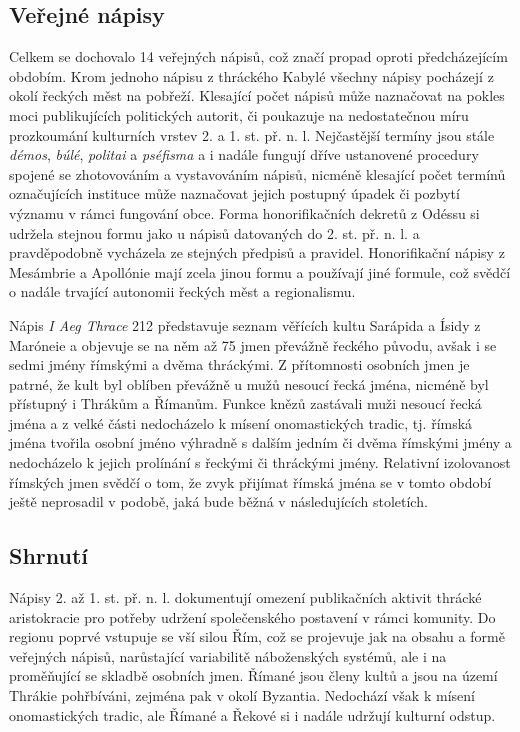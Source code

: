 \subsection[veřejné-nápisy-8]{Veřejné nápisy}

Celkem se dochovalo 14 veřejných nápisů, což značí propad oproti předcházejícím obdobím. Krom jednoho nápisu z thráckého Kabylé všechny nápisy pocházejí z okolí řeckých měst na pobřeží. Klesající počet nápisů může naznačovat na pokles moci publikujících politických autorit, či poukazuje na nedostatečnou míru prozkoumání kulturních vrstev 2. a 1. st. př. n. l. Nejčastější termíny jsou stále {\em démos}, {\em búlé}, {\em politai} a {\em pséfisma} a i nadále fungují dříve ustanovené procedury spojené se zhotovováním a vystavováním nápisů, nicméně klesající počet termínů označujících instituce může naznačovat jejich postupný úpadek či pozbytí významu v rámci fungování obce. Forma honorifikačních dekretů z Odéssu si udržela stejnou formu jako u nápisů datovaných do 2. st. př. n. l. a pravděpodobně vycházela ze stejných předpisů a pravidel. Honorifikační nápisy z Mesámbrie a Apollónie mají zcela jinou formu a používají jiné formule, což svědčí o nadále trvající autonomii řeckých měst a regionalismu.

Nápis {\em I Aeg Thrace} 212 představuje seznam věřících kultu Sarápida a Ísidy z Maróneie a objevuje se na něm až 75 jmen převážně řeckého původu, avšak i se sedmi jmény římskými a dvěma thráckými. Z přítomnosti osobních jmen je patrné, že kult byl oblíben převážně u mužů nesoucí řecká jména, nicméně byl přístupný i Thrákům a Římanům. Funkce knězů zastávali muži nesoucí řecká jména a z velké části nedocházelo k mísení onomastických tradic, tj. římská jména tvořila osobní jméno výhradně s dalším jedním či dvěma římskými jmény a nedocházelo k jejich prolínání s řeckými či thráckými jmény. Relativní izolovanost římských jmen svědčí o tom, že zvyk přijímat římská jména se v tomto období ještě neprosadil v podobě, jaká bude běžná v následujících stoletích.

\subsection[shrnutí-12]{Shrnutí}

Nápisy 2. až 1. st. př. n. l. dokumentují omezení publikačních aktivit thrácké aristokracie pro potřeby udržení společenského postavení v rámci komunity. Do regionu poprvé vstupuje se vší silou Řím, což se projevuje jak na obsahu a formě veřejných nápisů, narůstající variabilitě náboženských systémů, ale i na proměňující se skladbě osobních jmen. Římané jsou členy kultů a jsou na území Thrákie pohřbíváni, zejména pak v okolí Byzantia. Nedochází však k mísení onomastických tradic, ale Římané a Řekové si i nadále udržují kulturní odstup.

